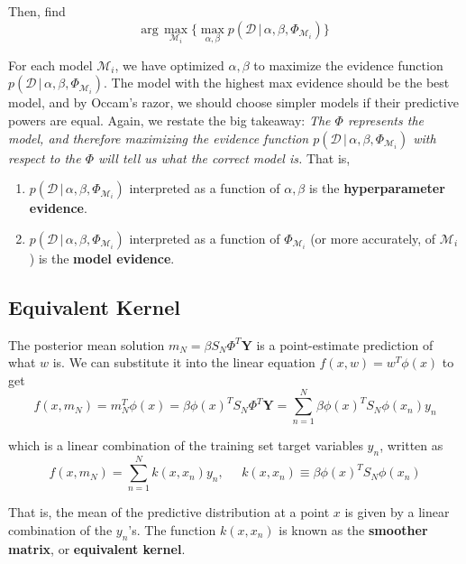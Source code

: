 \documentclass{article}
\begin{document}
    Then, find
    \begin{equation}
      \text{arg}\, \max_{\mathcal{M}_i} \{ \max_{\alpha, \beta} p(\mathcal{D}\,|\,\alpha, \beta, \Phi_{\mathcal{M}_i}) \}
    \end{equation}

    For each model $\mathcal{M}_i$, we have optimized $\alpha, \beta$ to maximize the evidence function $p(\mathcal{D}\,|\,\alpha, \beta, \Phi_{\mathcal{M}_i})$. The model with the highest max evidence should be the best model, and by Occam's razor, we should choose simpler models if their predictive powers are equal. Again, we restate the big takeaway: \textit{The $\Phi$ represents the model, and therefore maximizing the evidence function $p(\mathcal{D}\,|\, \alpha, \beta, \Phi_{\mathcal{M}_i})$ with respect to the $\Phi$ will tell us what the correct model is.} That is,
    \begin{enumerate}
      \item $p(\mathcal{D}\,|\, \alpha, \beta, \Phi_{\mathcal{M}_i})$ interpreted as a function of $\alpha, \beta$ is the \textbf{hyperparameter evidence}.
      \item $p(\mathcal{D}\,|\, \alpha, \beta, \Phi_{\mathcal{M}_i})$ interpreted as a function of $\Phi_{\mathcal{M}_i}$ (or more accurately, of $\mathcal{M}_i$) is the \textbf{model evidence}.
    \end{enumerate}

  \subsection{Equivalent Kernel}

    The posterior mean solution $m_N = \beta S_N \Phi^T \mathbf{Y}$ is a point-estimate prediction of what $w$ is. We can substitute it into the linear equation $f(x, w) = w^T \phi(x)$ to get
    \begin{equation}
      f(x, m_N) = m_N^T \phi(x) = \beta \phi(x)^T S_N \Phi^T \mathbf{Y} = \sum_{n=1}^N \beta \phi(x)^T S_N \phi(x_n) y_n
    \end{equation}

    which is a linear combination of the training set target variables $y_n$, written as
    \begin{equation}
      f(x, m_N) = \sum_{n=1}^N k(x, x_n) y_n, \;\;\;\;\; k(x, x_n) \equiv \beta \phi(x)^T S_N \phi(x_n)
    \end{equation}

    That is, the mean of the predictive distribution at a point $x$ is given by a linear combination of the $y_n$'s. The function $k(x, x_n)$ is known as the \textbf{smoother matrix}, or \textbf{equivalent kernel}.
\end{document}
